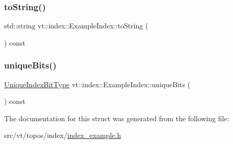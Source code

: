 \mbox{\label{structvt_1_1index_1_1_example_index_affdc9729ea50c86b3c04a18dc69c396d}} 
\subsubsection{\texorpdfstring{to\+String()}{toString()}}
{\footnotesize\ttfamily std\+::string vt\+::index\+::\+Example\+Index\+::to\+String (\begin{DoxyParamCaption}{ }\end{DoxyParamCaption}) const}

\mbox{\label{structvt_1_1index_1_1_example_index_abec47decec01c0eccdf3e2db1658a521}} 
\subsubsection{\texorpdfstring{unique\+Bits()}{uniqueBits()}}
{\footnotesize\ttfamily \hyperlink{namespacevt_a913e1f07b5228dd8bb64040dc6dcea14}{Unique\+Index\+Bit\+Type} vt\+::index\+::\+Example\+Index\+::unique\+Bits (\begin{DoxyParamCaption}{ }\end{DoxyParamCaption}) const}



The documentation for this struct was generated from the following file\+:\begin{DoxyCompactItemize}
\item 
src/vt/topos/index/\hyperlink{index__example_8h}{index\+\_\+example.\+h}\end{DoxyCompactItemize}
